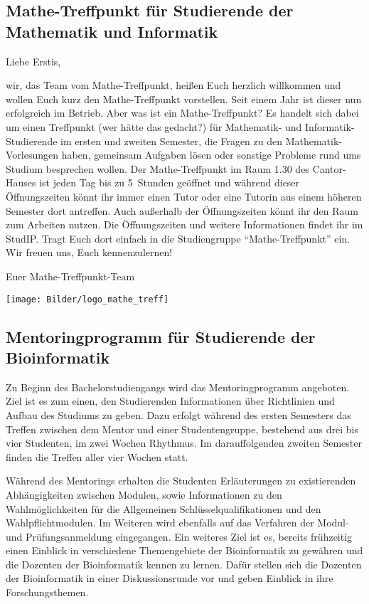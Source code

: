 \subsection[Mathe-Treffpunkt]{Mathe-Treffpunkt für Studierende der Mathematik und Informatik}

Liebe Erstis,

wir, das Team vom Mathe-Treffpunkt, heißen Euch herzlich willkommen und 
wollen Euch kurz den Mathe-Treffpunkt vorstellen. Seit einem Jahr ist 
dieser nun erfolgreich im Betrieb. Aber was ist ein Mathe-Treffpunkt? Es 
handelt sich dabei um einen Treffpunkt (wer hätte das gedacht?) für 
Mathematik- und Informatik- Studierende im ersten und zweiten Semester, 
die Fragen zu den Mathematik-Vorlesungen haben, gemeinsam Aufgaben lösen 
oder sonstige Probleme rund ums Studium besprechen wollen. Der 
Mathe-Treffpunkt im Raum 1.30 des Cantor-Hauses ist jeden Tag bis zu 5~Stunden geöffnet und während 
dieser Öffnungszeiten könnt ihr immer einen Tutor oder eine Tutorin aus 
einem höheren Semester dort antreffen. Auch außerhalb der Öffnungszeiten 
könnt ihr den Raum zum Arbeiten nutzen. Die Öffnungszeiten und weitere 
Informationen findet ihr im StudIP. Tragt Euch dort einfach in die 
Studiengruppe "`Mathe-Treffpunkt"' ein.
Wir freuen uns, Euch kennenzulernen!

Euer Mathe-Treffpunkt-Team

\begin{center}
    \texttt{[image: Bilder/logo\_mathe\_treff]}%
\end{center}

\subsection[Mentoringprogramm]{Mentoringprogramm für Studierende der Bioinformatik}

Zu Beginn des Bachelorstudiengangs 
wird das Mentoringprogramm angeboten. 
Ziel ist es zum einen, den Studierenden 
Informationen über Richtlinien und Aufbau des Studiums zu geben. 
Dazu erfolgt während des ersten Semesters 
das Treffen zwischen dem Mentor und einer Studentengruppe,
bestehend aus drei bis vier Studenten, 
im zwei Wochen Rhythmus.
Im darauffolgenden zweiten Semester 
finden die Treffen aller vier Wochen statt.

Während des Mentorings erhalten die Studenten 
Erläuterungen zu existierenden Abhängigkeiten zwischen Modulen, 
sowie Informationen zu den Wahlmöglichkeiten 
für die Allgemeinen Schlüsselqualifikationen 
und den Wahlpflichtmodulen. 
Im Weiteren wird ebenfalls auf das Verfahren der
Modul- und Prüfungsanmeldung eingegangen. 
Ein weiteres Ziel ist es, bereits frühzeitig einen Einblick 
in verschiedene Themengebiete der Bioinformatik 
zu gewähren und die Dozenten der Bioinformatik kennen
zu lernen. 
Dafür stellen sich die Dozenten der Bioinformatik 
in einer Diskussionsrunde vor und geben
Einblick in ihre Forschungsthemen.

